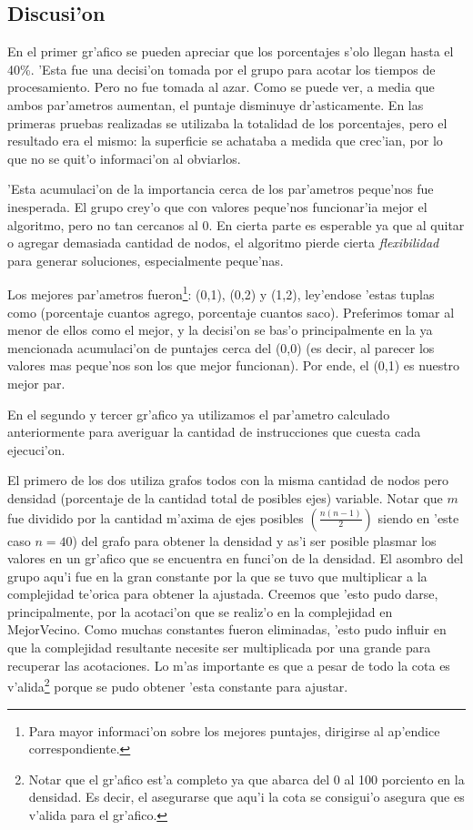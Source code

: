 \subsection{Discusi'on}
En el primer gr'afico se pueden apreciar que los porcentajes s'olo llegan hasta el 40\%. 'Esta fue una decisi'on tomada por el grupo para acotar los tiempos de procesamiento. Pero no fue tomada al azar. Como se puede ver, a media que ambos par'ametros aumentan, el puntaje disminuye dr'asticamente. En las primeras pruebas realizadas se utilizaba la totalidad de los porcentajes, pero el resultado era el mismo: la superficie se achataba a medida que crec'ian, por lo que no se quit'o informaci'on al obviarlos. 

'Esta acumulaci'on de la importancia cerca de los par'ametros peque'nos fue inesperada. El grupo crey'o que con valores peque'nos funcionar'ia mejor el algoritmo, pero no tan cercanos al 0. En cierta parte es esperable ya que al quitar o agregar demasiada cantidad de nodos, el algoritmo pierde cierta \emph{flexibilidad} para generar soluciones, especialmente peque'nas.

Los mejores par'ametros fueron\footnote{Para mayor informaci'on sobre los mejores puntajes, dirigirse al ap'endice correspondiente.}: (0,1), (0,2) y (1,2), ley'endose 'estas tuplas como (porcentaje cuantos agrego, porcentaje cuantos saco). Preferimos tomar al menor de ellos como el mejor, y la decisi'on se bas'o principalmente en la ya mencionada acumulaci'on de puntajes cerca del (0,0) (es decir, al parecer los valores mas peque'nos son los que mejor funcionan). Por ende, el (0,1) es nuestro mejor par.

En el segundo y tercer gr'afico ya utilizamos el par'ametro calculado anteriormente para averiguar la cantidad de instrucciones que cuesta cada ejecuci'on. 

El primero de los dos utiliza grafos todos con la misma cantidad de nodos pero densidad (porcentaje de la cantidad total de posibles ejes) variable. Notar que $m$ fue dividido por la cantidad m'axima de ejes posibles $\left(\frac{n(n-1)}{2}\right)$ siendo en 'este caso $n=40$) del grafo para obtener la densidad y as'i ser posible plasmar los valores en un gr'afico que se encuentra en funci'on de la densidad. El asombro del grupo aqu'i fue en la gran constante por la que se tuvo que multiplicar a la complejidad te'orica para obtener la ajustada. Creemos que 'esto pudo darse, principalmente, por la acotaci'on que se realiz'o en la complejidad en MejorVecino. Como muchas constantes fueron eliminadas, 'esto pudo influir en que la complejidad resultante necesite ser multiplicada por una grande para recuperar las acotaciones. Lo m'as importante es que a pesar de todo la cota es v'alida\footnote{Notar que el gr'afico est'a completo ya que abarca del 0 al 100 porciento en la densidad. Es decir, el asegurarse que aqu'i la cota se consigui'o asegura que es v'alida para el gr'afico.} porque se pudo obtener 'esta constante para ajustar.

